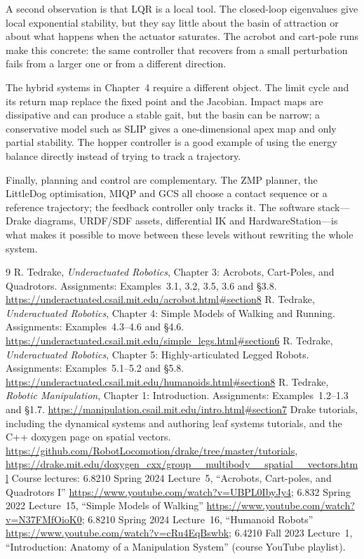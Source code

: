 \documentclass[11pt]{report}
\begin{document}
A second observation is that LQR is a local tool.  The closed-loop eigenvalues
give local exponential stability, but they say little about the basin of
attraction or about what happens when the actuator saturates.  The acrobot and
cart-pole runs make this concrete: the same controller that recovers from a
small perturbation fails from a larger one or from a different direction.

The hybrid systems in Chapter~4 require a different object.  The limit cycle
and its return map replace the fixed point and the Jacobian.  Impact maps are
dissipative and can produce a stable gait, but the basin can be narrow; a
conservative model such as SLIP gives a one-dimensional apex map and only
partial stability.  The hopper controller is a good example of using the energy
balance directly instead of trying to track a trajectory.

Finally, planning and control are complementary.  The ZMP planner, the
LittleDog optimisation, MIQP and GCS all choose a contact sequence or a
reference trajectory; the feedback controller only tracks it.  The software
stack---Drake diagrams, URDF/SDF assets, differential IK and
HardwareStation---is what makes it possible to move between these levels
without rewriting the whole system.

\begin{thebibliography}{9}
 R. Tedrake, \emph{Underactuated Robotics}, Chapter 3:
Acrobots, Cart-Poles, and Quadrotors.  Assignments: Examples~3.1, 3.2, 3.5,
3.6 and \S3.8.
\url{https://underactuated.csail.mit.edu/acrobot.html#section8}
 R. Tedrake, \emph{Underactuated Robotics},
Chapter 4: Simple Models of Walking and Running.  Assignments:
Examples~4.3--4.6 and \S4.6.
\url{https://underactuated.csail.mit.edu/simple_legs.html#section6}
 R. Tedrake, \emph{Underactuated Robotics},
Chapter 5: Highly-articulated Legged Robots.  Assignments: Examples~5.1--5.2
and \S5.8.
\url{https://underactuated.csail.mit.edu/humanoids.html#section8}
 R. Tedrake, \emph{Robotic Manipulation},
Chapter 1: Introduction.  Assignments: Examples~1.2--1.3 and \S1.7.
\url{https://manipulation.csail.mit.edu/intro.html#section7}
 Drake tutorials, including the dynamical systems and
authoring leaf systems tutorials, and the C++ doxygen page on spatial vectors.
\url{https://github.com/RobotLocomotion/drake/tree/master/tutorials},
\url{https://drake.mit.edu/doxygen_cxx/group__multibody__spatial__vectors.html}
 Course lectures:
6.8210 Spring 2024 Lecture~5, ``Acrobots, Cart-poles, and Quadrotors I''
\url{https://www.youtube.com/watch?v=UBPL0IbyJy4};
6.832 Spring 2022 Lecture~15, ``Simple Models of Walking''
\url{https://www.youtube.com/watch?v=N37FMfOioK0};
6.8210 Spring 2024 Lecture~16, ``Humanoid Robots''
\url{https://www.youtube.com/watch?v=cRu4EqBswbk};
6.4210 Fall 2023 Lecture~1, ``Introduction: Anatomy of a Manipulation System''
(course YouTube playlist).
\end{thebibliography}
\end{document}

